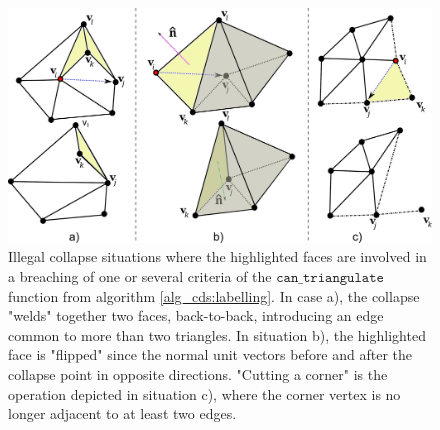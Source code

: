 \documentclass[graybox]{svmult}
\begin{document}
	
	\begin{figure}[t]
		\centering 
		\includegraphics[width=.95\columnwidth]{forbidden_collapse_cases.pdf} 
		\caption{Illegal collapse situations where the highlighted faces are involved in a breaching of one or several criteria of the $\mathtt{can\_triangulate}$ function from algorithm  \ref{alg_cds:labelling}. In case a), the collapse "welds" together two faces, back-to-back, introducing an edge common to more than two triangles. In situation b), the highlighted face is "flipped" since the normal unit vectors before and after the collapse point in opposite directions. "Cutting a corner" is the operation depicted in situation c), where the corner vertex is no longer adjacent to at least two edges.} 
		\label{fig_cds:forbidden_collapses} 
	\end{figure}
	
\end{document}
